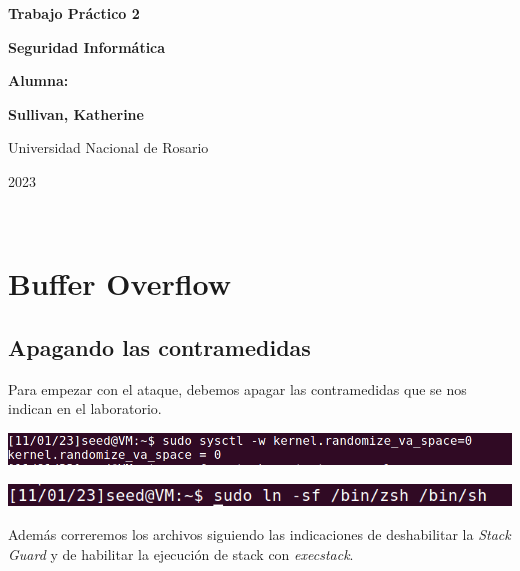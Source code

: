 \documentclass[11pt]{article}
\begin{document}
\begin{titlepage}
    \begin{center}
        \vfill
        \vfill
            \vspace{0.7cm}
            \noindent\textbf{\Huge Trabajo Práctico 2}\par
            \noindent\textbf{\Huge Seguridad Informática}\par
            \vspace{.5cm}
        \vfill
        \noindent \textbf{\huge Alumna:}\par
        \vspace{.5cm}
        \noindent \textbf{\Large Sullivan, Katherine}\par
 
        \vfill
        \large Universidad Nacional de Rosario \par
        \noindent\large 2023
    \end{center}
\end{titlepage}
\ \par



\section{Buffer Overflow}

\subsection*{Apagando las contramedidas}
Para empezar con el ataque, debemos apagar las contramedidas que se nos indican en el laboratorio. 

\begin{center}
\includegraphics*[scale=0.7, width=1\textwidth]{deshab1.png}
\end{center}

\begin{center}
\includegraphics*[scale=0.8, width=1\textwidth]{deshab2.png}
\end{center}

Además correremos los archivos siguiendo las indicaciones de deshabilitar la \textit{Stack Guard} y
de habilitar la ejecución de stack con \textit{execstack}.
\end{document}
